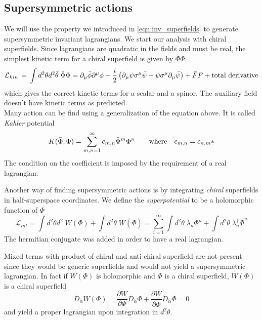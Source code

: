 \begin{appendices}
\section{Supersymmetric actions}
We will use the property we introduced in \ref{eqn:inv_superfields} to generate supersymmetric invariant lagrangians.
We start our analysis with chiral superfields.
Since lagrangians are quadratic in the fields and must be real, the simplest kinetic term for a chiral superfield is given by $ \bar{\Phi} \Phi$. 
\begin{equation}
 \mathcal{L}_{kin} \, = \, \int d^2 \theta d^2 \bar{\theta} \; \bar{\Phi} \Phi = \partial_{\mu} \bar{\phi} \partial^{\mu} \phi + \frac{i}{2} \left( \partial_{\mu} \psi \sigma^{\mu} \bar{\psi} - \psi \sigma^{\mu} \partial_{\mu} \bar{\psi} \right) + \bar{F} F + \hbox{total derivative}
\end{equation}		
which gives the correct kinetic terms for a scalar and a spinor.
The auxiliary field doesn't have kinetic terms as predicted.\\
Many action can be find using a generalization of the equation above. It is called \emph{Kahler} potential   
\begin{equation}
K ( \bar{\Phi} , \Phi) = \sum_{m,n=1}^{\infty} c_{m,n} \bar{\Phi}^m \Phi^n \qquad \hbox{where} \quad c_{m,n} = c_{n,m}*
\end{equation}
The condition on the coefficient is imposed by the requirement of a real lagrangian. 

Another way of finding supersymmetric actions is by  integrating \emph{chiral} superfields in half-superspace coordinates.
We define the \emph{superpotential} to be a holomorphic function of $\Phi$ 
\begin{equation}
 \mathcal{L}_{int} = \int  d^2 \theta d^2  \; W ( \Phi)  +  \int d^2 \bar{\theta} \; \bar{W} ( \bar{\Phi} ) = \sum_{i=1}^\infty  \int  d^2 \theta \; \lambda_n \Phi^n + \int d^2 \bar{\theta}\;  \lambda_n^{\dagger} \bar{\Phi}^n
\end{equation} 
The hermitian conjugate was added in order to have a real lagrangian.

Mixed terms with product of chiral and anti-chiral superfield are not present since they would be generic superfields and would not yield a supersymmetric lagrangian.
In fact if $W(\Phi)$ is holomorphic and $\Phi$ is a chiral superfield, $W(\Phi)$ is a chiral superfield
\begin{equation}
 \bar{D}_{\dot{\alpha}} W (\Phi) = \frac{\partial W}{ \partial \Phi } \bar{D}_{\dot{\alpha}} \Phi + \frac{\partial W}{ \partial \bar{\Phi} } \bar{D}_{\dot{\alpha}} \bar{\Phi}  = 0 
\end{equation}
and yield a proper lagrangian upon integration in $ d^2 \theta$.


\end{appendices}
